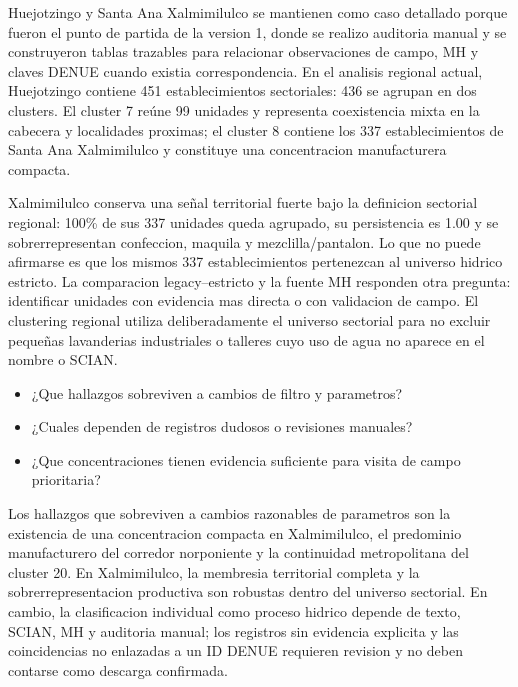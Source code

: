 \documentclass[11pt,letterpaper]{article}
\begin{document}
Huejotzingo y Santa Ana Xalmimilulco se mantienen como caso detallado porque fueron el punto de partida de la version 1, donde se realizo auditoria manual y se construyeron tablas trazables para relacionar observaciones de campo, MH y claves DENUE cuando existia correspondencia. En el analisis regional actual, Huejotzingo contiene 451 establecimientos sectoriales: 436 se agrupan en dos clusters. El cluster 7 reúne 99 unidades y representa coexistencia mixta en la cabecera y localidades proximas; el cluster 8 contiene los 337 establecimientos de Santa Ana Xalmimilulco y constituye una concentracion manufacturera compacta.

Xalmimilulco conserva una señal territorial fuerte bajo la definicion sectorial regional: 100\% de sus 337 unidades queda agrupado, su persistencia es 1.00 y se sobrerrepresentan confeccion, maquila y mezclilla/pantalon. Lo que no puede afirmarse es que los mismos 337 establecimientos pertenezcan al universo hidrico estricto. La comparacion legacy--estricto y la fuente MH responden otra pregunta: identificar unidades con evidencia mas directa o con validacion de campo. El clustering regional utiliza deliberadamente el universo sectorial para no excluir pequeñas lavanderias industriales o talleres cuyo uso de agua no aparece en el nombre o SCIAN.

\begin{preguntas}
\begin{itemize}
    \item ¿Que hallazgos sobreviven a cambios de filtro y parametros?
    \item ¿Cuales dependen de registros dudosos o revisiones manuales?
    \item ¿Que concentraciones tienen evidencia suficiente para visita de campo prioritaria?
\end{itemize}
\end{preguntas}

Los hallazgos que sobreviven a cambios razonables de parametros son la existencia de una concentracion compacta en Xalmimilulco, el predominio manufacturero del corredor norponiente y la continuidad metropolitana del cluster 20. En Xalmimilulco, la membresia territorial completa y la sobrerrepresentacion productiva son robustas dentro del universo sectorial. En cambio, la clasificacion individual como proceso hidrico depende de texto, SCIAN, MH y auditoria manual; los registros sin evidencia explicita y las coincidencias no enlazadas a un ID DENUE requieren revision y no deben contarse como descarga confirmada.
\end{document}
